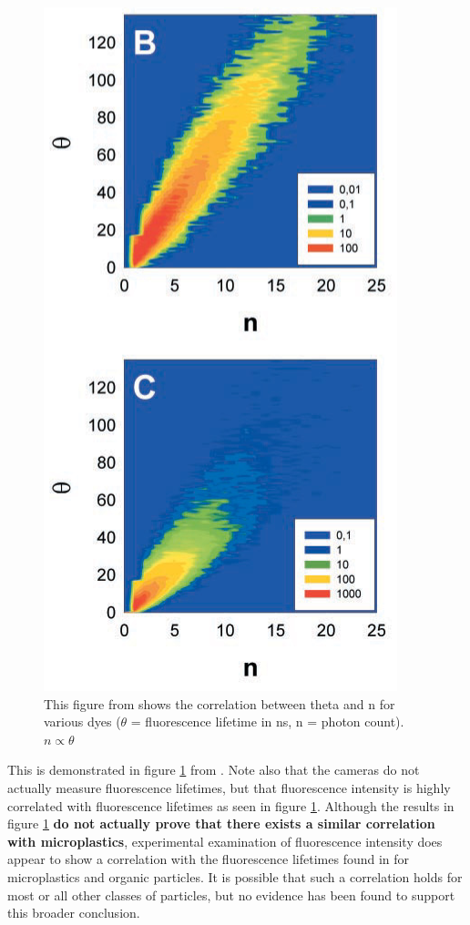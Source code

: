 \documentclass[fleqn,10pt]{SelfArx} %
\begin{document}
	\begin{figure}[h]
		\centering
		\includegraphics[width=0.5\linewidth]{Figures/FluorescenceCorrelation.png}
		\caption[Fluorescence Lifetime and Intensity Correlation]{This figure from \cite{Palo_Brand_Eggeling_Jäger_Kask_Gall_2002} shows the correlation between theta and n for various dyes ($\theta$ = fluorescence lifetime in ns, n = photon count). $n \propto \theta$}
		\label{fig:FluorescenceCorrelation}
	\end{figure}
	
	This is demonstrated in figure \ref{fig:FluorescenceCorrelation} from \cite{Palo_Brand_Eggeling_Jäger_Kask_Gall_2002}. Note also that the cameras do not actually measure fluorescence lifetimes, but that fluorescence intensity is highly correlated with fluorescence lifetimes as seen in figure \ref{fig:FluorescenceCorrelation}. Although the results in figure \ref{fig:FluorescenceCorrelation} \textbf{do not actually prove that there exists a similar correlation with microplastics}, experimental examination of fluorescence intensity does appear to show a correlation with the fluorescence lifetimes found in \cite{Wohlschläger_Versen_Löder_Laforsch_2024} for microplastics and organic particles. It is possible that such a correlation holds for most or all other classes of particles, but no evidence has been found to support this broader conclusion.
	
\end{document}
